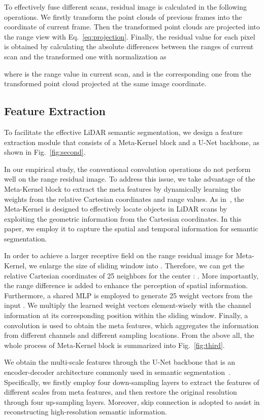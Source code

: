 \documentclass[letterpaper, 10 pt, journal, twoside]{ieeetran}
\begin{document}
To effectively fuse different scans, residual image is calculated in the following operations. We firstly transform the point clouds of previous frames into the coordinate of current frame. Then the transformed point clouds are projected into the range view with Eq.~\eqref{eq:projection}. Finally, the residual value  for each pixel is obtained by calculating the absolute differences between the ranges of current scan and the transformed one with normalization as

where  is the range value in current scan, and  is the corresponding one from the transformed point cloud projected at the same image coordinate. 


\subsection{Feature Extraction}
To facilitate the effective LiDAR semantic segmentation, we design a feature extraction module that consists of a Meta-Kernel block and a U-Net backbone, as shown in Fig.~\ref{fig:second}. 


In our empirical study, the conventional convolution operations do not perform well on the range residual image. To address this issue, we take advantage of the Meta-Kernel block to extract the meta features by dynamically learning the weights from the relative Cartesian coordinates and range values. As in~\cite{fan2021rangedet}, the Meta-Kernel is designed to effectively locate objects in LiDAR scans by exploiting the geometric information from the Cartesian coordinates. In this paper, we employ it to capture the spatial and temporal information for semantic segmentation. 


In order to achieve a larger receptive field on the range residual image for Meta-Kernel, we enlarge the size of sliding window into . Therefore, we can get the relative Cartesian coordinates of 25 neighbors  for the center  : . More importantly, the range difference is added to enhance the perception of spatial information. Furthermore, a shared MLP is employed to generate 25 weight vectors from the input . We multiply the learned weight vectors  element-wisely with the channel information  at its corresponding position within the sliding window. Finally, a  convolution is used to obtain the meta features, which aggregates the information from different channels and different sampling locations. From the above all, the whole process of Meta-Kernel block is summarized into Fig.~\ref{fig:third}.

We obtain the multi-scale features through the U-Net backbone that is an encoder-decoder architecture commonly used in semantic segmentation~\cite{ronneberger2015u,cortinhal2020salsanext}. Specifically, we firstly employ four down-sampling layers to extract the features of different scales from meta features, and then restore the original resolution through four up-sampling layers. Moreover, skip connection is adopted to assist in reconstructing high-resolution semantic information. 
\end{document}
